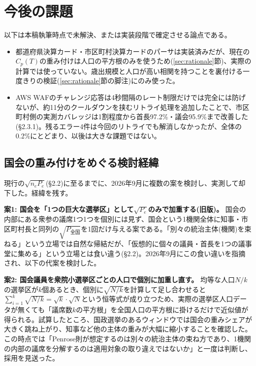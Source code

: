 \documentclass[a4paper,11pt]{ltjsarticle}
\begin{document}
\section{今後の課題}

以下は本稿執筆時点で未解決、または実装段階で確定させる論点である。

\begin{itemize}
  \item 都道府県決算カード・市区町村決算カードのパーサは実装済みだが、現在の$C_p(T)$の重み付けは人口の平方根のみを使うため(\ref{sec:rationale}節)、実際の計算では使っていない。歳出規模と人口が高い相関を持つことを裏付ける一度きりの検証(\ref{sec:rationale}節の脚注)にのみ使った。
  \item AWS WAFのチャレンジ応答は4秒間隔のレート制限だけでは完全には防げないが、約11分のクールダウンを挟むリトライ処理を追加したことで、市区町村側の実測カバレッジは1割程度から首長97.2\%・議会95.9\%まで改善した(\S2.3.1)。残るエラー4件は今回のリトライでも解消しなかったが、全体の0.2\%にとどまり、以後は大きな課題ではない。
\end{itemize}

\subsection{国会の重み付けをめぐる検討経緯}
\label{sec:diet-weighting-followup}

現行の$\sqrt{n_eP_e}$(\S2.2)に至るまでに、2026年9月に複数の案を検討し、実測して却下した。経緯を残す。

\textbf{案1: 国会を「1つの巨大な選挙区」として$\sqrt{P_e}$のみで加重する(旧版)。} 国会の内部にある衆参の議席1つ1つを個別には見ず、国会という1機関全体に知事・市区町村長と同列の$\sqrt{P_{\text{全国}}}$を1回だけ与える案である。「別々の統治主体(機関)を束ねる」という立場では自然な帰結だが、「仮想的に個々の議員・首長を1つの議事堂に集める」という立場とは食い違う(\S2.2)。2026年9月にこの食い違いを指摘され、以下の代案を検討した。

\textbf{案2: 国会議員を衆院小選挙区ごとの人口で個別に加重し直す。} 均等な人口$N/k$の選挙区が$k$個あるとき、個別に$\sqrt{N/k}$を計算して足し合わせると$\sum_{i=1}^{k}\sqrt{N/k} = \sqrt{k}\cdot\sqrt{N}$という恒等式が成り立つため、実際の選挙区人口データが無くても「議席数$k$の平方根」を全国人口の平方根に掛けるだけで近似値が得られる。試算したところ、国政選挙のあるウィンドウでは国会の重みシェアが大きく跳ね上がり、知事など他の主体の重みが大幅に縮小することを確認した。この時点では「Penrose則が想定するのは別々の統治主体の束ね方であり、1機関の内部の議席を分解するのは適用対象の取り違えではないか」と一度は判断し、採用を見送った。
\end{document}
